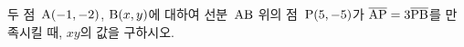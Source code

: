 두 점~$\mathrm{A}(-1{,}\mkern3mu\mathopen{}-2)$, $\mathrm{B}(x{,}\mkern3mu\mathopen{}y)$에 대하여 선분~$\mathrm{AB}$ 위의 점~$\mathrm{P}(5{,}\mkern3mu\mathopen{}-5)$가 $\overline{\mathrm{AP}}=3\overline{\mathrm{PB}}$를 만족시킬 때, $xy$의 값을 구하시오.
